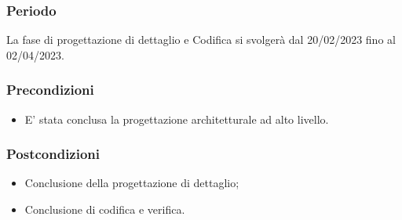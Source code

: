 \subsubsection{Periodo}
La fase di progettazione di dettaglio e Codifica si svolgerà dal 20/02/2023 fino al 02/04/2023.

\subsubsection{Precondizioni}
\begin{itemize}
    \item E’ stata conclusa la progettazione architetturale ad alto livello.
\end{itemize}

\subsubsection{Postcondizioni}
\begin{itemize}
    \item Conclusione della progettazione di dettaglio;
    \item Conclusione di codifica e verifica.
\end{itemize}

